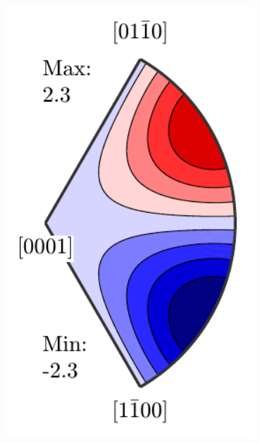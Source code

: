 \documentclass[compress]{beamer}
\begin{document}
\begin{frame}[fragile]
\begin{overlayarea}{\textwidth}{\textheight}
\begin{columns}
\begin{column}{0.28\textwidth}
        \includegraphics[width=0.7\textwidth]{pic/piezo}
      \end{column}
    \end{columns}






\end{overlayarea}
\end{frame}
\end{document}
